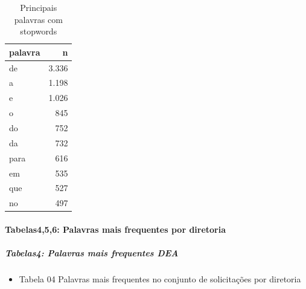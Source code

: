 \documentclass[]{article}
\providecommand{\tightlist}{%
  \setlength{\itemsep}{0pt}\setlength{\parskip}{0pt}}
\let\oldparagraph\paragraph
\renewcommand{\paragraph}[1]{\oldparagraph{#1}\mbox{}}
\let\oldsubparagraph\subparagraph
\renewcommand{\subparagraph}[1]{\oldsubparagraph{#1}\mbox{}}
\begin{document}
\begin{table}[!h]

\caption{\label{tab:unnamed-chunk-21}Principais palavras com stopwords}
\centering
\begin{tabular}{lr}
\toprule
palavra & n\\
\midrule
\rowcolor{gray!6}  de & 3.336\\
a & 1.198\\
\rowcolor{gray!6}  e & 1.026\\
o & 845\\
\rowcolor{gray!6}  do & 752\\
\addlinespace
da & 732\\
\rowcolor{gray!6}  para & 616\\
em & 535\\
\rowcolor{gray!6}  que & 527\\
no & 497\\
\bottomrule
\end{tabular}
\end{table}

\paragraph{Tabelas4,5,6: Palavras mais frequentes por
diretoria}\label{tabelas456-palavras-mais-frequentes-por-diretoria}

\subparagraph{Tabelas4: Palavras mais frequentes
DEA}\label{tabelas4-palavras-mais-frequentes-dea}

\begin{itemize}
\tightlist
\item
  Tabela 04 Palavras mais frequentes no conjunto de solicitações por
  diretoria
\end{itemize}
\end{document}
